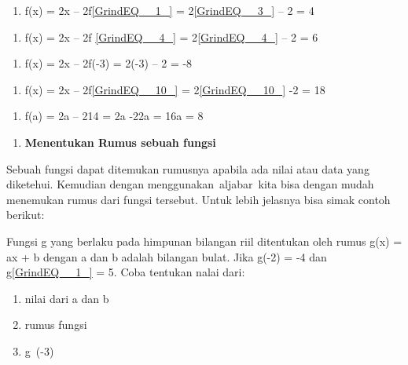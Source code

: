 \documentclass[11pt,fleqn]{book} %
\begin{document}
\noindent 

\begin{enumerate}
\item  f(x) = 2x -- 2f\eqref{GrindEQ__1_} = 2\eqref{GrindEQ__3_} -- 2 = 4
\end{enumerate}

\noindent 

\begin{enumerate}
\item  f(x) = 2x -- 2f \eqref{GrindEQ__4_} = 2\eqref{GrindEQ__4_} -- 2 = 6
\end{enumerate}

\noindent 

\begin{enumerate}
\item  f(x) = 2x -- 2f(-3) = 2(-3) -- 2 = -8
\end{enumerate}

\noindent 

\begin{enumerate}
\item  f(x) = 2x -- 2f\eqref{GrindEQ__10_} = 2\eqref{GrindEQ__10_} -2 = 18
\end{enumerate}

\noindent 

\begin{enumerate}
\item  f(a) = 2a -- 214 = 2a -22a = 16a = 8
\end{enumerate}

\noindent 

\begin{enumerate}
\item  \textbf{ Menentukan Rumus sebuah fungsi}
\end{enumerate}

\noindent 

\noindent Sebuah fungsi dapat ditemukan rumusnya apabila ada nilai atau data yang diketehui. Kemudian dengan menggunakan~aljabar~kita bisa dengan mudah menemukan rumus dari fungsi tersebut. Untuk lebih jelasnya bisa simak contoh berikut:

\noindent 

\noindent Fungsi g yang berlaku pada himpunan bilangan riil ditentukan oleh rumus g(x) = ax + b dengan a dan b adalah bilangan bulat. Jika g(-2) = -4 dan g\eqref{GrindEQ__1_} = 5. Coba tentukan nalai dari:

\noindent 

\begin{enumerate}
\item  nilai dari a dan b

\item  rumus fungsi

\item  g~(-3)
\end{enumerate}
\end{document}
